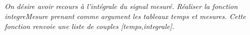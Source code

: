 \documentclass[10pt]{article}
\begin{document}
\subparagraph{}
\textit{On désire avoir recours à l'intégrale du signal mesuré. Réaliser la fonction \textsf{integreMesure} prenant comme argument les tableaux \textsf{temps} et \textsf{mesures}. Cette fonction renvoie une liste de couples \textsf{[temps,integrale]}.}
\end{document}

